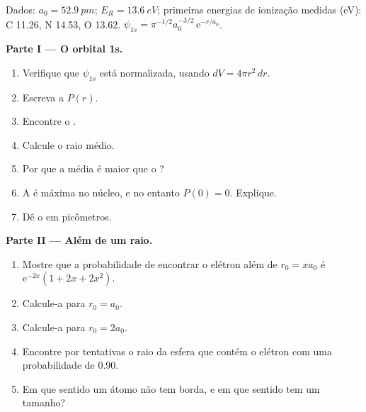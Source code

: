 \begin{problem}
\label{pb:b2:atomic-orbitals:1}
Dados: $a_0 = \qty{52.9}{pm}$; $E_R = \qty{13.6}{eV}$; primeiras energias de
ionização medidas (\unit{eV}): C 11.26, N 14.53, O 13.62. $\psi_{1s} = \pi^{-1/2}a_0^{-3/2}\,
\mathrm e^{-r/a_0}$.

\medskip
\noindent\textbf{Parte I --- O orbital 1s.}
\begin{enumerate}
  \item Verifique que $\psi_{1s}$ está normalizada, usando $dV = 4\pi r^2\,dr$.
  \item Escreva a  $P(r)$.
  \item Encontre o .
  \item Calcule o raio médio.
  \item Por que a média é maior que o ?
  \item A  é máxima no núcleo, e no entanto $P(0) = 0$.
        Explique.
  \item Dê o  em picômetros.
\end{enumerate}

\medskip
\noindent\textbf{Parte II --- Além de um raio.}
\begin{enumerate}[resume]
  \item Mostre que a probabilidade de encontrar o elétron além de $r_0 =
        xa_0$ é $\mathrm e^{-2x}(1 + 2x + 2x^2)$.
  \item Calcule-a para $r_0 = a_0$.
  \item Calcule-a para $r_0 = 2a_0$.
  \item Encontre por tentativas o raio da esfera que contém o elétron com uma
        probabilidade de 0.90.
  \item Em que sentido um átomo não tem borda, e em que sentido tem um tamanho?
\end{enumerate}


\end{problem}
